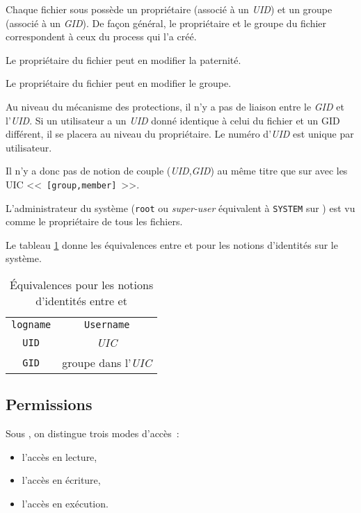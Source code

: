 Chaque fichier sous {\Unix} poss{\`e}de un propri{\'e}taire (associ{\'e} {\`a} un
{\sl UID}) et un groupe (associ{\'e} {\`a} un {\sl GID}). De fa\c{c}on g{\'e}n{\'e}ral, le
propri{\'e}taire et le groupe du fichier correspondent {\`a} ceux du process qui
l'a cr{\'e}{\'e}.

Le propri{\'e}taire du fichier peut en modifier la paternit{\'e}.

Le propri{\'e}taire du fichier peut en modifier le groupe.

Au niveau du m{\'e}canisme des protections, il n'y a pas de liaison entre le
{\sl GID} et l'{\sl UID}. Si un utilisateur a un {\sl UID} donn{\'e}
identique {\`a} celui du fichier et un GID diff{\'e}rent, il se placera au
niveau du propri{\'e}taire. Le num{\'e}ro d'{\sl UID} est unique par
utilisateur.

Il n'y a donc pas de notion de couple ({\sl UID},{\sl GID}) au m{\^e}me
titre que sur {\OpenVMS} avec les UIC <<~{\tt [group,member]}~>>.

L'administrateur du syst{\`e}me ({\tt root} ou {\sl super-user} {\'e}quivalent {\`a}
{\tt SYSTEM} sur {\OpenVMS}) est vu comme le propri{\'e}taire de tous les
fichiers.

Le tableau \ref{tab-cmds-equiv-root} donne les {\'e}quivalences entre {\Unix}
et {\OpenVMS} pour les notions d'identit{\'e}s sur le syst{\`e}me.

\begin{table}[hbtp]
\centering
\begin{tabular}{|c|c|}
	\hline
		{\Unix}			&	{\OpenVMS}				\\
	\hline \hline
		{\tt logname}	&	{\tt Username}			\\
	\hline
		{\tt UID}		&	{\sl UIC}				\\
	\hline
		{\tt GID}		&	groupe dans l'{\sl UIC}	\\
	\hline
\end{tabular}
\caption{\label{tab-cmds-equiv-root}\'{E}quivalences pour les notions d'identit{\'e}s
entre {\Unix} et {\OpenVMS}}
\end{table}

\subsection{Permissions}

Sous {\Unix}, on distingue trois modes
d'acc{\`e}s~:
\begin{itemize}
	\item l'acc{\`e}s en lecture,
	\item l'acc{\`e}s en {\'e}criture,
	\item l'acc{\`e}s en ex{\'e}cution.
\end{itemize}

